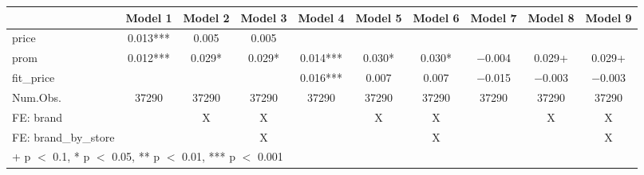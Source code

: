 \begin{table}
\centering
\begin{tabular}[t]{lccccccccc}
\toprule
  & Model 1 & Model 2 & Model 3 & Model 4 & Model 5 & Model 6 & Model 7 & Model 8 & Model 9\\
\midrule
price & \num{0.013}*** & \num{0.005} & \num{0.005} &  &  &  &  &  & \\
prom & \num{0.012}*** & \num{0.029}* & \num{0.029}* & \num{0.014}*** & \num{0.030}* & \num{0.030}* & \num{-0.004} & \num{0.029}+ & \num{0.029}+\\
fit\_price &  &  &  & \num{0.016}*** & \num{0.007} & \num{0.007} & \num{-0.015} & \num{-0.003} & \num{-0.003}\\
\midrule
Num.Obs. & \num{37290} & \num{37290} & \num{37290} & \num{37290} & \num{37290} & \num{37290} & \num{37290} & \num{37290} & \num{37290}\\
FE: brand &  & X & X &  & X & X &  & X & X\\
FE: brand_by_store &  &  & X &  &  & X &  &  & X\\
\bottomrule
\multicolumn{10}{l}{\rule{0pt}{1em}+ p $<$ 0.1, * p $<$ 0.05, ** p $<$ 0.01, *** p $<$ 0.001}\\
\end{tabular}
\end{table}
